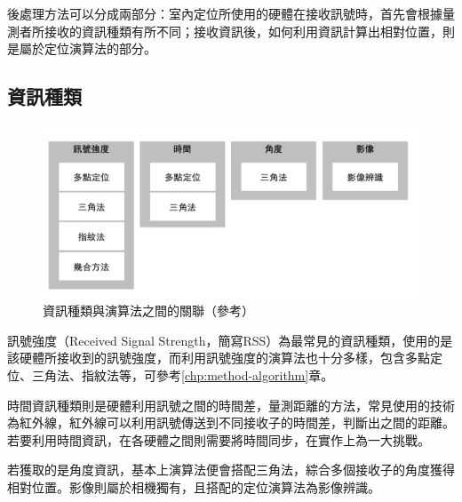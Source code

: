     後處理方法可以分成兩部分：室內定位所使用的硬體在接收訊號時，首先會根據量測者所接收的資訊種類有所不同；接收資訊後，如何利用資訊計算出相對位置，則是屬於定位演算法的部分。
    
    

    \subsection{資訊種類}
    
    \begin{figure}[h]
        \centering
        \includegraphics[width=12cm]{ch2pic/method_sort.png}
        \caption{資訊種類與演算法之間的關聯（參考\cite{survey_light2018}）}
        \label{pic:method_sort}
    \end{figure}

    訊號強度（Received Signal Strength，簡寫RSS）為最常見的資訊種類\cite{survey_indoor2018}，使用的是該硬體所接收到的訊號強度，而利用訊號強度的演算法也十分多樣，包含多點定位、三角法、指紋法等，可參考\ref{chp:method-algorithm}章。

    時間資訊種類則是硬體利用訊號之間的時間差，量測距離的方法，常見使用的技術為紅外線，紅外線可以利用訊號傳送到不同接收子的時間差，判斷出之間的距離。若要利用時間資訊，在各硬體之間則需要將時間同步，在實作上為一大挑戰\cite{survey_indoor2014}。

    若獲取的是角度資訊，基本上演算法便會搭配三角法，綜合多個接收子的角度獲得相對位置。影像則屬於相機獨有，且搭配的定位演算法為影像辨識。


